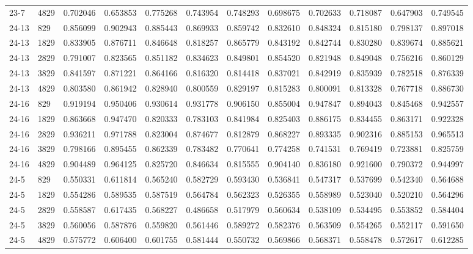 \begin{longtable}{llrrrrrrrrrr}
23-7 & 4829 & 0.702046 & 0.653853 & 0.775268 & 0.743954 & 0.748293 & 0.698675 & 0.702633 & 0.718087 & 0.647903 & 0.749545\\
24-13 & 829 & 0.856099 & 0.902943 & 0.885443 & 0.869933 & 0.859742 & 0.832610 & 0.848324 & 0.815180 & 0.798137 & 0.897018\\
24-13 & 1829 & 0.833905 & 0.876711 & 0.846648 & 0.818257 & 0.865779 & 0.843192 & 0.842744 & 0.830280 & 0.839674 & 0.885621\\
24-13 & 2829 & 0.791007 & 0.823565 & 0.851182 & 0.834623 & 0.849801 & 0.854520 & 0.821948 & 0.849048 & 0.756216 & 0.860129\\
24-13 & 3829 & 0.841597 & 0.871221 & 0.864166 & 0.816320 & 0.814418 & 0.837021 & 0.842919 & 0.835939 & 0.782518 & 0.876339\\
24-13 & 4829 & 0.803580 & 0.861942 & 0.828940 & 0.800559 & 0.829197 & 0.815283 & 0.800091 & 0.813328 & 0.767718 & 0.886730\\
24-16 & 829 & 0.919194 & 0.950406 & 0.930614 & 0.931778 & 0.906150 & 0.855004 & 0.947847 & 0.894043 & 0.845468 & 0.942557\\
24-16 & 1829 & 0.863668 & 0.947470 & 0.820333 & 0.783103 & 0.841984 & 0.825403 & 0.886175 & 0.834455 & 0.863171 & 0.922328\\
24-16 & 2829 & 0.936211 & 0.971788 & 0.823004 & 0.874677 & 0.812879 & 0.868227 & 0.893335 & 0.902316 & 0.885153 & 0.965513\\
24-16 & 3829 & 0.798166 & 0.895455 & 0.862339 & 0.783482 & 0.770641 & 0.774258 & 0.741531 & 0.769419 & 0.723881 & 0.825759\\
24-16 & 4829 & 0.904489 & 0.964125 & 0.825720 & 0.846634 & 0.815555 & 0.904140 & 0.836180 & 0.921600 & 0.790372 & 0.944997\\
24-5 & 829 & 0.550331 & 0.611814 & 0.565240 & 0.582729 & 0.593430 & 0.536841 & 0.547317 & 0.537699 & 0.542340 & 0.564688\\
24-5 & 1829 & 0.554286 & 0.589535 & 0.587519 & 0.564784 & 0.562323 & 0.526355 & 0.558989 & 0.523040 & 0.520210 & 0.564296\\
24-5 & 2829 & 0.558587 & 0.617435 & 0.568227 & 0.486658 & 0.517979 & 0.560634 & 0.538109 & 0.534495 & 0.553852 & 0.584404\\
24-5 & 3829 & 0.560056 & 0.587876 & 0.559820 & 0.561446 & 0.589272 & 0.582376 & 0.563509 & 0.554265 & 0.552117 & 0.591650\\
24-5 & 4829 & 0.575772 & 0.606400 & 0.601755 & 0.581444 & 0.550732 & 0.569866 & 0.568371 & 0.558478 & 0.572617 & 0.612285\\

\end{longtable}

